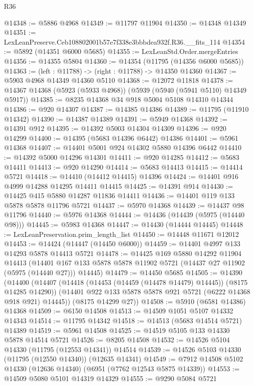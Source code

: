 \begin{lexlean}{R36}
\begin{coremodule}
@14348 := @5886 @4968
@14349 := @11797 @11904
@14350 := @14348 @14349
@14351 := LexLeanPreserve.Ceb108802001b57e7f338e3bbbdea932f.R36.__fits_114
@14354 := @5892 (@14351 @6000 @5685)
@14355 := LexLeanStd.Order.mergeEntries
@14356 := @14355 @5804
@14360 := @14354 (@11795 (@14356 @6000 @5685))
@14363 := (left : @11788) -> (right : @11788) -> @14350 @14360
@14367 := @5903 @4968 @14349 @14360 @5110
@14368 := @12072 @11818
@14378 := @14367 @14368 (@5923 (@5933 @4968)) (@5939 (@5940 (@5941 @5110) @14349 @5917))
@14385 := @8235 @14368 @34 @918 @5004 @5108 @14310 @14344
@14386 := @920 @14307
@14387 := @14385 @14386
@14389 := @11795 (@11910 @14342)
@14390 := @14387 @14389
@14391 := @5949 @14368
@14392 := @14391 @912
@14395 := @14392 @5003 @14304 @14309
@14396 := @920 @14299
@14400 := @14395 (@5683 @14396 @6442) @14386
@14401 := @5961 @14368
@14407 := @14401 @5001 @924 @14302 @5880 @14396 @6442
@14410 := @14392 @5000 @14296 @14301
@14411 := @920 @14285
@14412 := @5683 @14411
@14413 := @920 @14290
@14414 := @5683 @14413
@14415 := @14414 @5721
@14418 := @14410 (@14412 @14415) @14396
@14424 := @14401 @916 @4999 @14288 @14295 @14411 @14415
@14425 := @14391 @914
@14430 := @14425 @415 @5880 @14287 @11836 @14411
@14436 := @14401 @119 @133 @5878 @5878 @11796 @5721
@14437 := @5970 @14368
@14439 := @14437 @98 @11796
@14440 := @5976 @14368
@14444 := @14436 (@14439 (@5975 (@14440 @98)))
@14445 := @5983 @14368
@14447 := @14430 (@14444 @14445)
@14448 := LexLeanPreservation.prim_length_list
@14450 := @14448 @11671 @12012
@14453 := @14424 (@14447 (@14450 @6000))
@14459 := @14401 @4997 @133 @14293 @5878 @14413 @5721
@14478 := @14425
    @169
    @5880
    @14292
    @11904
    @14413
    (@14401 @167 @133 @5878 @5878 @11902 @5721 (@14437 @27 @11902 (@5975 (@14440 @27))) @14445)
@14479 := @14450 @5685
@14505 := @14390
    (@14400
      (@14407
        (@14418 (@14453 (@14459 (@14478 @14479) @14445)) (@8175 @14285 @14290))
        (@14401 @922 @133 @5878 @5878 @921 @5721 (@6222 @14368 @918 @921) @14445))
      (@8175 @14299 @27))
@14508 := @5910 (@6581 @14386) @14368
@14509 := @6150 @14508
@14513 := @14509 @1051 @5107 @14332 @14343
@14514 := @11795 @14342
@14518 := @14513 (@5683 @14514 @5721) @14389
@14519 := @5961 @14508
@14525 := @14519 @5105 @133 @14330 @5878 @14514 @5721
@14526 := @8205 @14508
@14532 := @14526 @5104 @14330 (@11795 (@12553 @14341)) @14514
@14539 := @14526 @5103 @14330 (@11795 (@12550 @14340)) (@12635 @14341)
@14549 := @7912 @14508 @5102 @14330 (@12636 @14340) (@6951 (@7762 @12543 @5875 @14339))
@14553 := @14509 @5080 @5101 @14319 @14329
@14555 := @9290 @5084 @5721

\end{coremodule}
\end{lexlean}
